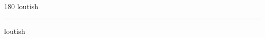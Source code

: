 
\begin{frame}
\begin{center}
\begin{turn}{180}
{\fontsize{2.5cm}{1em}\selectfont loutish}
\end{turn}
\vspace{1em}\par  
\hrule
\vspace{1em}\par  
{\fontsize{2.5cm}{1em}\selectfont loutish}
\end{center}
\end{frame}
